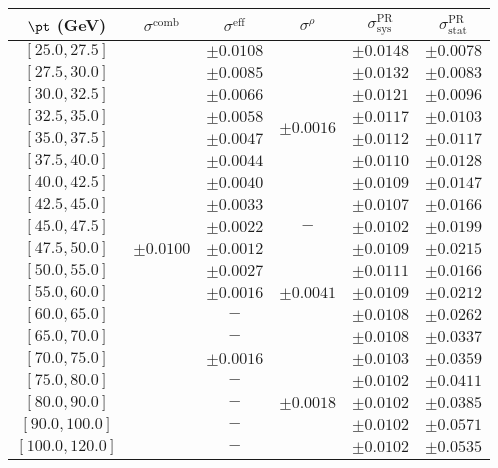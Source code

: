 \begin{tabular}{c||c|c|c||c|c}
$\pt$ (GeV) & $\sigma^{\text{comb}}$ & $\sigma^{\text{eff}}$ & $\sigma^\rho$ & $\sigma_{\text{sys}}^{\text{PR}}$ & $\sigma_{\text{stat}}^{\text{PR}}$ \\
\hline
$[25.0, 27.5]$ & \multirow{19}{*}{$\pm0.0100$} & $\pm0.0108$ & \multirow{8}{*}{$\pm0.0016$} & $\pm0.0148$ & $\pm0.0078$\\
$[27.5, 30.0]$ &  & $\pm0.0085$ &  & $\pm0.0132$ & $\pm0.0083$\\
$[30.0, 32.5]$ &  & $\pm0.0066$ &  & $\pm0.0121$ & $\pm0.0096$\\
$[32.5, 35.0]$ &  & $\pm0.0058$ &  & $\pm0.0117$ & $\pm0.0103$\\
$[35.0, 37.5]$ &  & $\pm0.0047$ &  & $\pm0.0112$ & $\pm0.0117$\\
$[37.5, 40.0]$ &  & $\pm0.0044$ &  & $\pm0.0110$ & $\pm0.0128$\\
$[40.0, 42.5]$ &  & $\pm0.0040$ &  & $\pm0.0109$ & $\pm0.0147$\\
$[42.5, 45.0]$ &  & $\pm0.0033$ &  & $\pm0.0107$ & $\pm0.0166$\\\cline{4-4}
$[45.0, 47.5]$ &  & $\pm0.0022$ & \multirow{1}{*}{$-$} & $\pm0.0102$ & $\pm0.0199$\\\cline{4-4}
$[47.5, 50.0]$ &  & $\pm0.0012$ & \multirow{5}{*}{$\pm0.0041$} & $\pm0.0109$ & $\pm0.0215$\\
$[50.0, 55.0]$ &  & $\pm0.0027$ &  & $\pm0.0111$ & $\pm0.0166$\\
$[55.0, 60.0]$ &  & $\pm0.0016$ &  & $\pm0.0109$ & $\pm0.0212$\\
$[60.0, 65.0]$ &  & $-$ &  & $\pm0.0108$ & $\pm0.0262$\\
$[65.0, 70.0]$ &  & $-$ &  & $\pm0.0108$ & $\pm0.0337$\\\cline{4-4}
$[70.0, 75.0]$ &  & $\pm0.0016$ & \multirow{5}{*}{$\pm0.0018$} & $\pm0.0103$ & $\pm0.0359$\\
$[75.0, 80.0]$ &  & $-$ &  & $\pm0.0102$ & $\pm0.0411$\\
$[80.0, 90.0]$ &  & $-$ &  & $\pm0.0102$ & $\pm0.0385$\\
$[90.0, 100.0]$ &  & $-$ &  & $\pm0.0102$ & $\pm0.0571$\\
$[100.0, 120.0]$ &  & $-$ &  & $\pm0.0102$ & $\pm0.0535$\\
\end{tabular}
